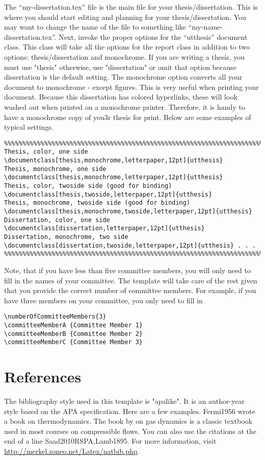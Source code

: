 The ``my-dissertation.tex'' file is the main file for your thesis/dissertation. This is where you should start editing and planning for your thesis/dissertation. You may want to change the name of the file to something like ``my-name-dissertation.tex''. Next, invoke the proper options for the ``utthesis'' document class. This class will take all the options for the report class in addition to two options: thesis/dissertation and monochrome. If you are writing a thesis, you must use "thesis" otherwise, use "dissertation" or omit that option because dissertation is the default setting. The monochrome option converts all your document to monochrome - except figures. This is very useful when printing your document. Because this dissertation has colored hyperlinks, these will look washed out when printed on a monochrome printer. Therefore, it is handy to have a monochrome copy of you3r thesis for print. Below are some examples of typical settings.
\begin{verbatim}
%%%%%%%%%%%%%%%%%%%%%%%%%%%%%%%%%%%%%%%%%%%%%%%%%%%%%%%%%%%%%%%%%%%%%%%%%%%
Thesis, color, one side
\documentclass[thesis,monochrome,letterpaper,12pt]{utthesis}
Thesis, monochrome, one side
\documentclass[thesis,monochrome,letterpaper,12pt]{utthesis}
Thesis, color, twoside side (good for binding)
\documentclass[thesis,twoside,letterpaper,12pt]{utthesis}
Thesis, monochrome, twoside side (good for binding)
\documentclass[thesis,monochrome,twoside,letterpaper,12pt]{utthesis}
Dissertation, color, one side
\documentclass[dissertation,letterpaper,12pt]{utthesis}
Dissertation, monochrome, two side
\documentclass[dissertation,twoside,letterpaper,12pt]{utthesis} . . .
%%%%%%%%%%%%%%%%%%%%%%%%%%%%%%%%%%%%%%%%%%%%%%%%%%%%%%%%%%%%%%%%%%%%%%%%%%%
\end{verbatim}

Note, that if you have less than five committee members, you will only need to fill in the names of your committee. The template will take care of the rest given that you provide the correct number of committee members. For example, if you have three members on your committee, you only need to fill in
\begin{verbatim}
\numberOfCommitteeMembers{3}
\committeeMemberA {Committee Member 1}
\committeeMemberB {Committee Member 2}
\committeeMemberC {Committee Member 3}
\end{verbatim}

\section{References}
The bibliography style used in this template is "apalike". It is an author-year style based on the APA specification. Here are a few examples. Fermi1956 wrote a book on thermodynamics. The book by \cite{utk:idr2016optimization} on gas dynamics is a classic textbook used in most courses on compressible flows. You can also use the citations at the end of a line Saad2010RSPA,Lamb1895. For more information, visit \href{http://merkel.zoneo.net/Latex/natbib.php}{http://merkel.zoneo.net/Latex/natbib.php}.

